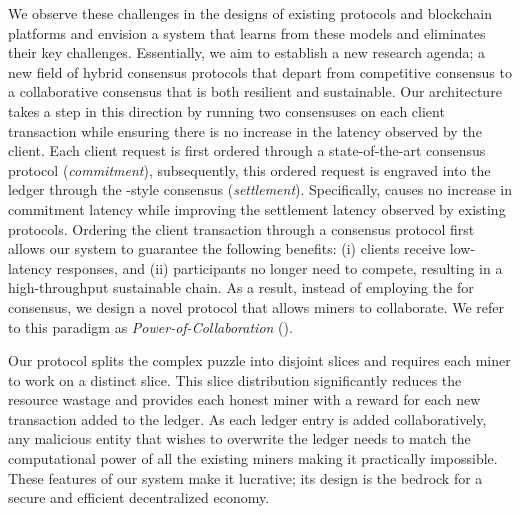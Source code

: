 We observe these challenges in the designs of existing \BFT{} protocols and 
blockchain platforms and envision a \DualChain{} system that learns from these 
models and eliminates their key challenges. Essentially, we aim to establish a 
new research agenda; a new field of hybrid consensus protocols that depart from 
competitive consensus to a collaborative consensus that is both resilient and 
sustainable. Our \DualChain{} architecture takes a step in this direction by 
running two consensuses on each client transaction while ensuring there is no 
increase in the latency observed by the client. Each client request is first 
ordered through a state-of-the-art \BFT{} consensus protocol ({\em commitment}), 
subsequently, this ordered request is engraved into the ledger through the 
\PoW-style consensus ({\em settlement}). Specifically, \DualChain{} causes no 
increase in commitment latency while improving the settlement latency observed 
by existing protocols. Ordering the client transaction through a \BFT{} consensus 
protocol first allows our \DualChain{} system to guarantee the following benefits: 
(i) clients receive low-latency responses, and (ii) \PoW{} participants no longer 
need to compete, resulting in a high-throughput sustainable chain. As a result, 
instead of employing the \PoW{} for consensus, we design a novel protocol that 
allows miners to collaborate. We refer to this paradigm as 
{\em Power-of-Collaboration} (\PoC{}). 

Our \PoC{} protocol splits the complex puzzle into disjoint slices and requires 
each miner to work on a distinct slice. This slice distribution significantly 
reduces the resource wastage and provides each honest miner with a reward 
for each new transaction added to the ledger. As each ledger entry is added 
collaboratively, any malicious entity that wishes to overwrite the ledger 
needs to match the computational power of all the existing miners making it 
practically impossible. These features of our \DualChain{} system make it 
lucrative; its design is the bedrock for a secure and efficient decentralized 
economy.
